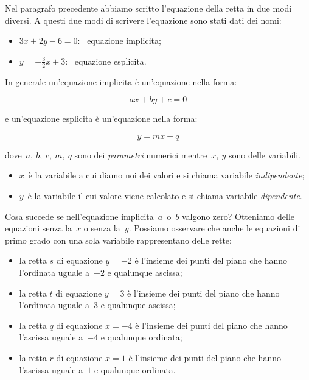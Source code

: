 Nel paragrafo precedente abbiamo scritto l'equazione della retta in due modi 
diversi. A questi due modi di scrivere l'equazione sono stati dati dei nomi:

\begin{itemize}
 \item \(3x + 2y - 6 = 0\):~ equazione implicita;
 \item \(y = -\frac{3}{2}x +3\):~ equazione esplicita.
\end{itemize}

In generale un'equazione implicita è un'equazione nella forma:

\[ax + by + c = 0\]

e un'equazione esplicita è un'equazione nella forma:

\[y = mx + q\]

dove~\(a,~b,~c,~m,~q\) sono dei \emph{parametri} numerici mentre~\(x,~y\) sono 
delle variabili.

\begin{itemize}
 \item \(x\)~è la variabile a cui diamo noi dei valori e si chiama 
  variabile \emph{indipendente};
 \item \(y\)~è la variabile il cui valore viene calcolato e si chiama 
  variabile \emph{dipendente}.
\end{itemize}

Cosa succede se nell'equazione implicita~\(a\)~o~\(b\) valgono zero?
Otteniamo delle equazioni senza la~\(x\) o senza la~\(y\). 
Possiamo osservare che anche le equazioni di primo grado con una sola 
variabile rappresentano delle rette:

\begin{itemize}
 \item la retta \(s\) di equazione \(y=-2\) è l'insieme dei punti del piano 
  che hanno l'ordinata uguale a~\(-2\) e qualunque ascissa;
 \item la retta \(t\) di equazione \(y=3\) è l'insieme dei punti del piano 
  che hanno l'ordinata uguale a~\(3\) e qualunque ascissa;
 \item la retta \(q\) di equazione \(x=-4\) è l'insieme dei punti del piano 
  che hanno l'ascissa uguale a~\(-4\) e qualunque ordinata;
 \item la retta \(r\) di equazione \(x=1\) è l'insieme dei punti del piano 
  che hanno l'ascissa uguale a~\(1\) e qualunque ordinata.
\end{itemize}

